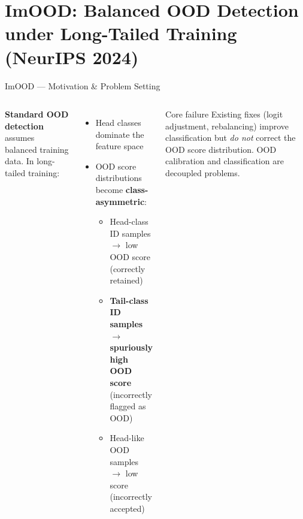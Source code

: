 \documentclass[aspectratio=169,10pt]{beamer}
\begin{document}
\section{ImOOD: Balanced OOD Detection under Long-Tailed Training (NeurIPS 2024)}

\begin{frame}{ImOOD --- Motivation \& Problem Setting}
  \begin{columns}[T]
      \textbf{Standard OOD detection} assumes balanced training data.
      In long-tailed training:
      \vspace{4pt}
      \begin{itemize}
        \item Head classes dominate the feature space
        \item OOD score distributions become \textbf{class-asymmetric}:
        \begin{itemize}
          \item Head-class ID samples $\to$ low OOD score (correctly retained)
          \item \textbf{Tail-class ID samples $\to$ spuriously high OOD score}\\
                (incorrectly flagged as OOD)
          \item Head-like OOD samples $\to$ low score (incorrectly accepted)
        \end{itemize}
      \end{itemize}
      \vspace{6pt}
      \begin{alertblock}{Core failure}
        Existing fixes (logit adjustment, rebalancing) improve classification
        but \emph{do not} correct the OOD score distribution.
        OOD calibration and classification are decoupled problems.
      \end{alertblock}


\end{columns}
\end{frame}
\end{document}

